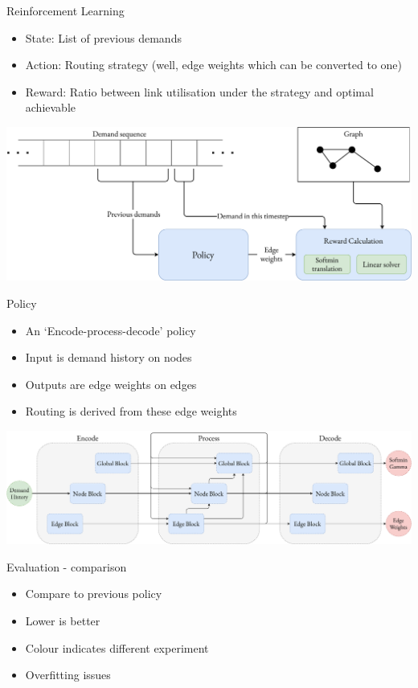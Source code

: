 \documentclass{beamer}
\begin{document}
\begin{frame}{Reinforcement Learning}
  \begin{itemize}
    \item State: List of previous demands
    \item Action: Routing strategy (well, edge weights which can be converted to one)
    \item Reward: Ratio between link utilisation under the strategy and optimal achievable
  \end{itemize}
  \includegraphics[width=\textwidth]{figures/environment.pdf}
\end{frame}

\begin{frame}{Policy}
  \begin{itemize}
    \item An `Encode-process-decode'\cite{battaglia2018relational} policy
    \item Input is demand history on nodes
    \item Outputs are edge weights on edges
    \item Routing is derived from these edge weights
  \end{itemize}
  \vspace{2em}
  \includegraphics[width=\textwidth]{figures/encode_process_decode.pdf}
\end{frame}

\begin{frame}{Evaluation - comparison}
  \begin{itemize}
    \item Compare to previous policy
    \item Lower is better
    \item Colour indicates different experiment
    \item Overfitting issues
  \end{itemize}
  \centering
  \resizebox{0.7\textwidth}{!}{}
\end{frame}
\end{document}
